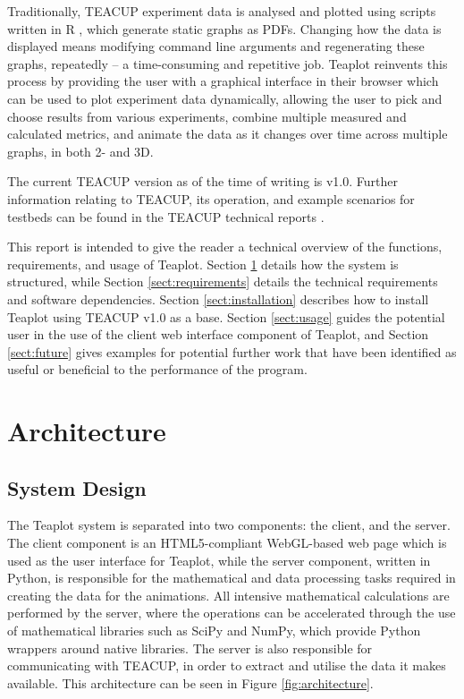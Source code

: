 \documentclass[a4paper,twocolumn,english,11pt, a4paper, conference]{IEEEtran}
\begin{document}
Traditionally, TEACUP experiment data is analysed and plotted using scripts written in R \cite{R}, which generate static graphs as PDFs. Changing how the data is displayed means modifying command line arguments and regenerating these graphs, repeatedly -- a time-consuming and repetitive job. Teaplot reinvents this process by providing the user with a graphical interface in their browser which can be used to plot experiment data dynamically, allowing the user to pick and choose results from various experiments, combine multiple measured and calculated metrics, and animate the data as it changes over time across multiple graphs, in both 2- and 3D. 

The current TEACUP version as of the time of writing is v1.0. Further information relating to TEACUP, its operation, and example scenarios for testbeds can be found in the TEACUP technical reports \cite{CAIA-TR-150529A} \cite{CAIA-TR-150529B} \cite{CAIA-TR-150529C} \cite{CAIA-TR-150210C}.

This report is intended to give the reader a technical overview of the functions, requirements, and usage of Teaplot. Section \ref{sect:architecture} details how the system is structured, while Section \ref{sect:requirements} details the technical requirements and software dependencies. Section \ref{sect:installation} describes how to install Teaplot using TEACUP v1.0 as a base. Section \ref{sect:usage} guides the potential user in the use of the client web interface component of Teaplot, and Section \ref{sect:future} gives examples for potential further work that have been identified as useful or beneficial to the performance of the program.
\section{Architecture}
\label{sect:architecture}
\subsection{System Design}
The Teaplot system is separated into two components: the client, and the server. The client component is an HTML5-compliant WebGL-based web page which is used as the user interface for Teaplot, while the server component, written in Python, is responsible for the mathematical and data processing tasks required in creating the data for the animations. All intensive mathematical calculations are performed by the server, where the operations can be accelerated through the use of mathematical libraries such as SciPy and NumPy, which provide Python wrappers around native libraries. The server is also responsible for communicating with TEACUP, in order to extract and utilise the data it makes available. This architecture can be seen in Figure \ref{fig:architecture}.
\end{document}

